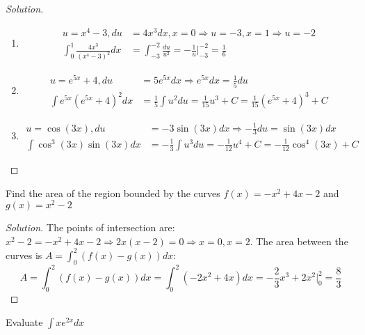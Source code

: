 \documentclass[crop=false,class=article,oneside]{standalone}
\begin{document}
        \begin{proof}[Solution]
        \
        \begin{enumerate}
            \item   \begin{align*}
            u=x^{4}-3,du&=4x^{3}dx,x=0\Rightarrow u=-3,x=1\Rightarrow u=-2\\
            \int_{0}^{1}\frac{4x^{3}}{(x^{4}-3)^{2}}dx&=\int_{-3}^{-2}\frac{du}{u^{2}}=-\frac{1}{u}\big|_{-3}^{-2}=\frac{1}{6}
                    \end{align*}
            \item   \begin{align*}
            u=e^{5x}+4,du&=5e^{5x}dx\Rightarrow e^{5x}dx=\frac{1}{5}du\\
            \int e^{5x}(e^{5x}+4)^{2}dx&=\frac{1}{5}\int u^{2}du=\frac{1}{15}u^{3}+C=\frac{1}{15}(e^{5x}+4)^{3}+C
                    \end{align*}
            \item   \begin{align*}
            u=\cos(3x),du&=-3\sin(3x)dx\Rightarrow -\frac{1}{3}du=\sin(3x)dx\\
            \int \cos^{3}(3x)\sin(3x)dx&=-\frac{1}{3}\int u^{3}du=-\frac{1}{12}u^{4}+C=-\frac{1}{12}\cos^{4}(3x)+C
                    \end{align*}
        \end{enumerate}
        \end{proof}
        \begin{problem}
        Find the area of the region bounded by the curves $f(x)=-x^{2}+4x-2$ and $g(x)=x^{2}-2$
        \end{problem}
        \begin{proof}[Solution]
        The points of intersection are: $x^{2}-2=-x^{2}+4x-2\Rightarrow 2x(x-2)=0\Rightarrow x=0,x=2$.
        The area between the curves is $A=\int_{0}^{2}(f(x)-g(x))dx$:
        \begin{equation*}
            A=\int_{0}^{2}(f(x)-g(x))dx=\int_{0}^{2}(-2x^{2}+4x)dx=-\frac{2}{3}x^{3}+2x^{2}\big|_{0}^{2}=\frac{8}{3}
        \end{equation*}
        \end{proof}
        \begin{problem}
        Evaluate $\int xe^{2x}dx$
        \end{problem}
\end{document}
